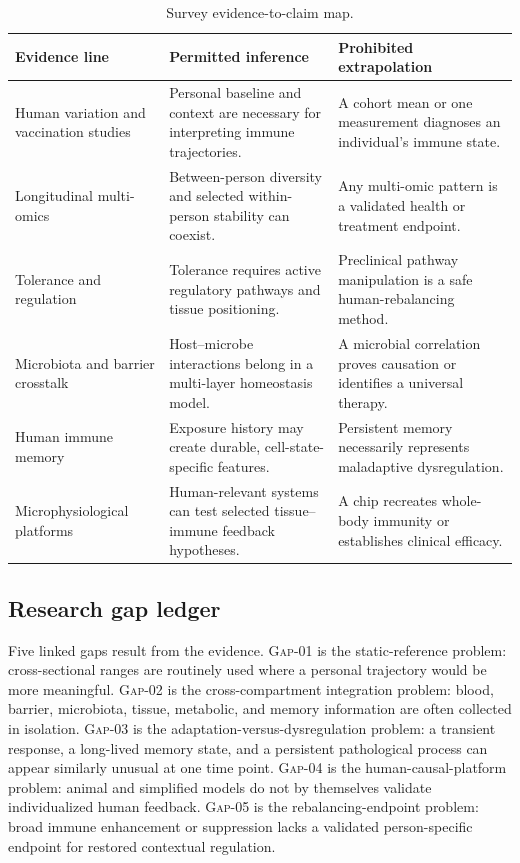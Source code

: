 \documentclass[conference]{IEEEtran}
\newcommand{\layer}[1]{\textsc{#1}}
\begin{document}
\begin{table}[t]
\caption{Survey evidence-to-claim map.}
\label{tab:evidence}
\centering
\renewcommand{\arraystretch}{1.16}
\begin{tabular}{|p{}|p{}|p{}|}
\hline
\textbf{Evidence line} & \textbf{Permitted inference} & \textbf{Prohibited extrapolation} \\
\hline
Human variation and vaccination studies \cite{brodin2017,tsang2014} & Personal baseline and context are necessary for interpreting immune trajectories. & A cohort mean or one measurement diagnoses an individual's immune state. \\
\hline
Longitudinal multi-omics \cite{tebani2020} & Between-person diversity and selected within-person stability can coexist. & Any multi-omic pattern is a validated health or treatment endpoint. \\
\hline
Tolerance and regulation \cite{izcue2006} & Tolerance requires active regulatory pathways and tissue positioning. & Preclinical pathway manipulation is a safe human-rebalancing method. \\
\hline
Microbiota and barrier crosstalk \cite{belkaid2014,zheng2020,pickard2017} & Host--microbe interactions belong in a multi-layer homeostasis model. & A microbial correlation proves causation or identifies a universal therapy. \\
\hline
Human immune memory \cite{ruckert2022} & Exposure history may create durable, cell-state-specific features. & Persistent memory necessarily represents maladaptive dysregulation. \\
\hline
Microphysiological platforms \cite{maharjan2020,kim2016,leung2022} & Human-relevant systems can test selected tissue--immune feedback hypotheses. & A chip recreates whole-body immunity or establishes clinical efficacy. \\
\hline
\end{tabular}
\end{table}

\subsection{Research gap ledger}

Five linked gaps result from the evidence. \layer{Gap-01} is the static-reference problem: cross-sectional ranges are routinely used where a personal trajectory would be more meaningful. \layer{Gap-02} is the cross-compartment integration problem: blood, barrier, microbiota, tissue, metabolic, and memory information are often collected in isolation. \layer{Gap-03} is the adaptation-versus-dysregulation problem: a transient response, a long-lived memory state, and a persistent pathological process can appear similarly unusual at one time point. \layer{Gap-04} is the human-causal-platform problem: animal and simplified models do not by themselves validate individualized human feedback. \layer{Gap-05} is the rebalancing-endpoint problem: broad immune enhancement or suppression lacks a validated person-specific endpoint for restored contextual regulation.
\end{document}
